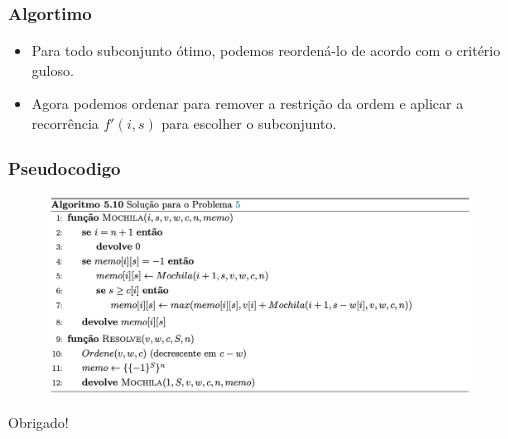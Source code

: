\documentclass{beamer}
\begin{document}

\begin{frame}
\frametitle{Algortimo}

\begin{itemize}
\item Para todo subconjunto ótimo, podemos reordená-lo de acordo com o critério guloso.
\item Agora podemos ordenar para remover a restrição da ordem e aplicar a recorrência $f'(i, s)$ para escolher o subconjunto.
\end{itemize}

\end{frame}


\begin{frame}
\frametitle{Pseudocodigo}

\begin{figure}
\includegraphics[width=0.8\linewidth]{pseudo.png}
\end{figure}

\end{frame}


\begin{frame}
\Huge{\centerline{Obrigado!}}
\end{frame}

\end{document}
